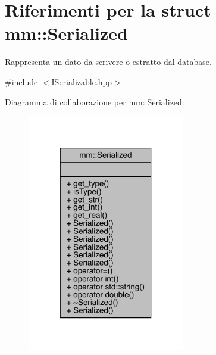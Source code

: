 \hypertarget{structmm_1_1_serialized}{}\section{Riferimenti per la struct mm\+:\+:Serialized}
\label{structmm_1_1_serialized}


Rappresenta un dato da scrivere o estratto dal database.  




{\ttfamily \#include $<$I\+Serializable.\+hpp$>$}



Diagramma di collaborazione per mm\+:\+:Serialized\+:
\nopagebreak
\begin{figure}[H]
\begin{center}
\leavevmode
\includegraphics[width=195pt]{d2/de9/structmm_1_1_serialized__coll__graph}
\end{center}
\end{figure}
